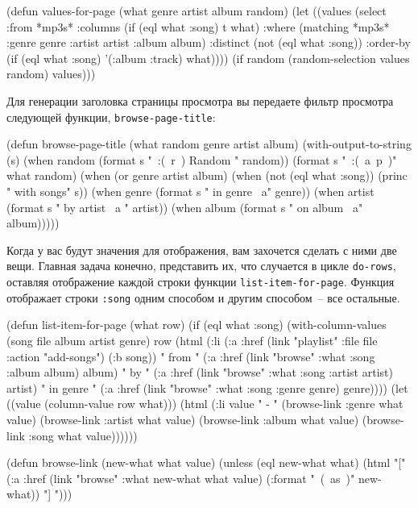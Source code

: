 \begin{myverb}
(defun values-for-page (what genre artist album random)
  (let ((values
         (select 
          :from *mp3s*
          :columns (if (eql what :song) t what)
          :where (matching *mp3s* :genre genre :artist artist :album album)
          :distinct (not (eql what :song))
          :order-by (if (eql what :song) '(:album :track) what))))
    (if random (random-selection values random) values)))
\end{myverb}

Для генерации заголовка страницы просмотра вы передаете фильтр просмотра следующей
функции, \lstinline{browse-page-title}:

\begin{myverb}
(defun browse-page-title (what random genre artist album)
  (with-output-to-string (s)
    (when random (format s "~:(~r~) Random " random))
    (format s "~:(~a~p~)" what random)
    (when (or genre artist album)
      (when (not (eql what :song)) (princ " with songs" s))
      (when genre  (format s " in genre ~a" genre))
      (when artist (format s " by artist ~a " artist))
      (when album  (format s " on album ~a" album)))))
\end{myverb}

Когда у вас будут значения для отображения, вам захочется сделать с ними две вещи. Главная
задача конечно, представить их, что случается в цикле \lstinline{do-rows}, оставляя
отображение каждой строки функции \lstinline{list-item-for-page}. Функция отображает строки
\lstinline{:song} одним способом и другим способом~-- все остальные. 

\begin{myverb}
(defun list-item-for-page (what row)
  (if (eql what :song)
    (with-column-values (song file album artist genre) row
      (html
        (:li
         (:a :href (link "playlist" :file file :action "add-songs") (:b song)) " from "
         (:a :href (link "browse"  :what :song :album  album) album) " by "
         (:a :href (link "browse" :what :song :artist artist) artist) " in genre "
         (:a :href (link "browse"  :what :song :genre  genre) genre))))
    (let ((value (column-value row what)))
      (html
       (:li value " - "
            (browse-link :genre  what value)
            (browse-link :artist what value)
            (browse-link :album  what value)
            (browse-link :song   what value))))))

(defun browse-link (new-what what value)
  (unless (eql new-what what)
    (html
     "[" 
     (:a :href (link "browse" :what new-what what value) (:format "~(~as~)" new-what))
     "] ")))
\end{myverb}

